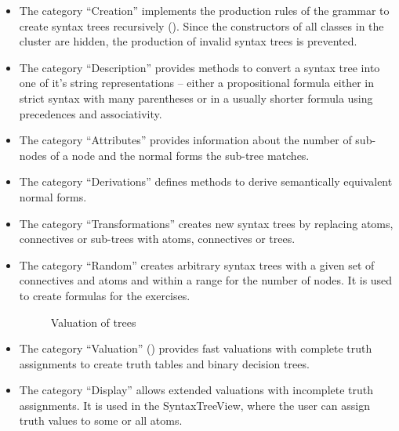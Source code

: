 \begin{itemize}

\item The category “Creation” implements the production rules of the grammar 
to create syntax trees recursively ().
Since the constructors of all classes in the cluster are hidden, 
the production of invalid syntax trees is prevented.

\item The category “Description” provides methods to convert a syntax tree into one of it's string representations – 
either a propositional formula either in strict syntax with many parentheses 
or in a usually shorter formula using precedences and associativity. 

\item The category “Attributes”  provides information about the number of sub-nodes of a node 
and the normal forms the sub-tree matches.

\item The category “Derivations” defines methods to derive semantically equivalent normal forms.

\item The category “Transformations” creates new syntax trees by replacing atoms, connectives or sub-trees with
atoms, connectives or trees.

\item The category “Random” creates arbitrary syntax trees with a given set of connectives and atoms and within a range for the number of nodes. It is used to create formulas for the exercises.


\begin{figure}[htbp]
\begin{center}
\caption{Valuation of trees}
\label{fig:NyayaNodeValuation}
\end{center}
\end{figure}

\item The category “Valuation” () 
provides fast valuations with complete truth assignments to create truth tables and binary decision trees. 

\item The category “Display”  allows extended valuations with incomplete truth assignments. 
It is used in the SyntaxTreeView, where the user can assign truth values to some or all atoms.
\end{itemize}

